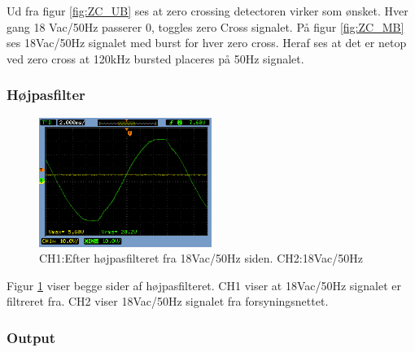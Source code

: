 Ud fra figur \ref{fig:ZC_UB} ses at zero crossing detectoren virker som ønsket. Hver gang 18 Vac/50Hz passerer 0, toggles zero Cross signalet.
På figur \ref{fig:ZC_MB} ses 18Vac/50Hz signalet med burst for hver zero cross. Heraf ses at det er netop ved zero cross at 120kHz bursted placeres på 50Hz signalet. 



\subsubsection{Højpasfilter}

\begin{figure}[H]
	\centering
	\includegraphics[width=0.50\textwidth]{billeder/HWTest/Encoder/Encoder_hojpasfilter}
	\caption{CH1:Efter højpasfilteret fra 18Vac/50Hz siden. CH2:18Vac/50Hz}
	\label{fig:HP_SCOP}
\end{figure}

Figur \ref{fig:HP_SCOP} viser begge sider af højpasfilteret. CH1 viser at 18Vac/50Hz signalet er filtreret fra. CH2 viser 18Vac/50Hz signalet fra forsyningsnettet.


\subsubsection{Output}

